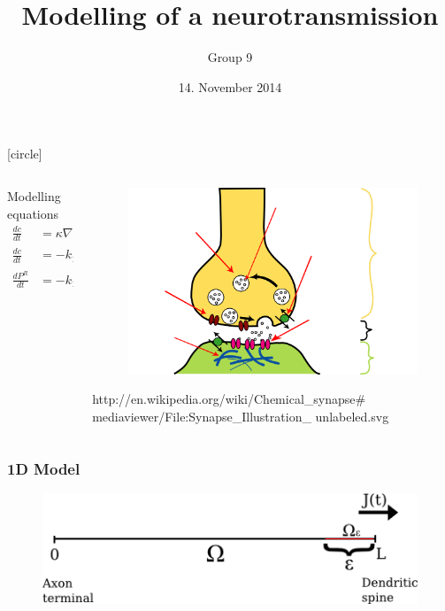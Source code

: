 \documentclass[screen]{beamer}
\title[Mathematical Modelling]%
{Modelling of a neurotransmission}
\author[Group 9]{Group 9}
\institute[NTNU]{Mathematical Modelling}
\date{14. November 2014}
\begin{document}
[circle]

\ntnutitlepage



\begin{frame}
\begin{columns}
    \begin{column}{.5\linewidth}
      \begin{block}{Modelling equations}
         \begin{align*}
         \frac{dc}{dt} &= \kappa \nabla^2 c \\
           \frac{dc}{dt} &= -k_1 c P^R + k_2 (1-P^R) \\
           \frac{dP^R}{dt} &=  -k_1 c P^R + k_2 (1-P^R)
         \end{align*}
      \end{block}
    \end{column}
    \begin{column}{.5\linewidth}
        \begin{figure}
  		\includegraphics[scale=0.1]{synapse.png}
  		\end{figure}	
  		\tiny http://en.wikipedia.org/wiki/Chemical\_synapse\# mediaviewer/File:Synapse\_Illustration\_ unlabeled.svg
  		
    \end{column}
  \end{columns}
\end{frame}


\begin{frame}
  \frametitle{1D Model}
   \begin{figure}
   \includegraphics[scale=0.7]{model_1d.png}
  \end{figure}
\end{frame}
\end{document}
